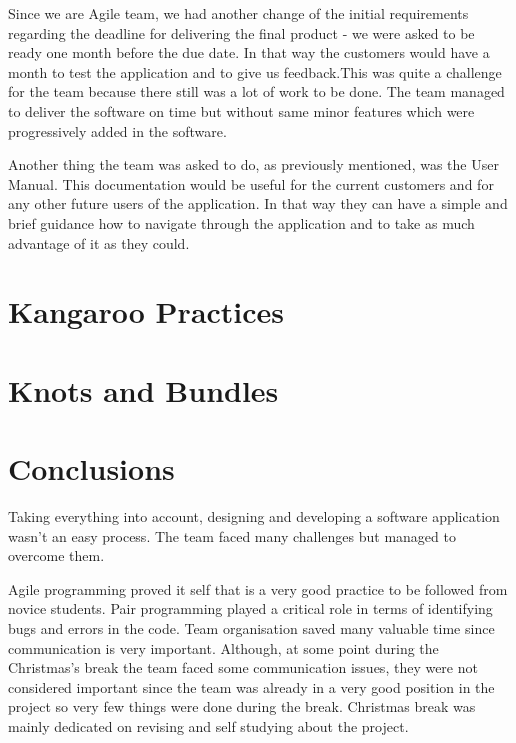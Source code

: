 \documentclass{l3proj}
\begin{document}
Since we are Agile team, we had another change of the initial requirements regarding the deadline for delivering the final product - we were asked to be ready one month before the due date. In that way the customers would have a month to test the application and to give us feedback.This was quite a challenge for the team because there still was a lot of work to be done. The team managed to deliver the software on time but without same minor features which were progressively added in the software.

Another thing the team was asked to do, as previously mentioned, was the User Manual. This documentation would be useful for the current customers and for any other future users of the application. In that way they can have a simple and brief guidance how to navigate through the application and to take as much advantage of it as they could.



\section{Kangaroo Practices}



\section{Knots and Bundles}
\label{sec:managing}


\section{Conclusions}

Taking everything into account, designing and developing a software application wasn't an easy process. The team faced many challenges but managed to overcome them.

Agile programming proved it self that is a very good practice to be followed from novice students. Pair programming played a critical role in terms of identifying bugs and errors in the code. Team organisation saved many valuable time since communication is very important. Although, at some point during the Christmas's break the team faced some communication issues, they were not considered important since the team was already in a very good position in the project so very few things were done during the break. Christmas break was mainly dedicated on revising and self studying about the project.
\end{document}
